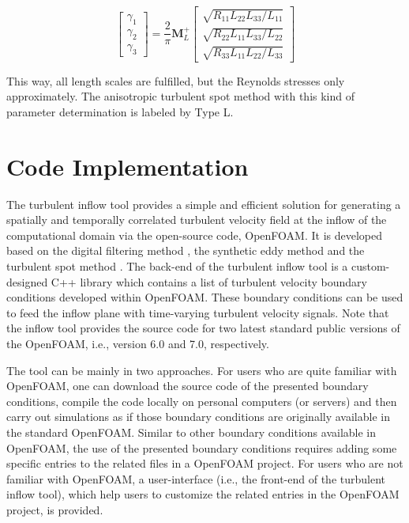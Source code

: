 \begin{equation}
\begin{bmatrix}
\gamma_1 \\
\gamma_2 \\
\gamma_3
\end{bmatrix}=\frac{2}{\pi}\boldsymbol{M}_L^+
\begin{bmatrix}
\sqrt{R_{11}L_{22}L_{33}/L_{11}} \\
\sqrt{R_{22}L_{11}L_{33}/L_{22}} \\
\sqrt{R_{33}L_{11}L_{22}/L_{33}}
\end{bmatrix}
\end{equation}

\noindent This way, all length scales are fulfilled, but the Reynolds stresses only approximately. The anisotropic turbulent spot method with this kind of parameter determination is labeled by Type L.

\section{Code Implementation}

The turbulent inflow tool provides a simple and efficient solution for generating a spatially and temporally correlated turbulent velocity field at the inflow of the computational domain via the open-source code, OpenFOAM. It is developed based on the digital filtering method \citep{klein2003, xie2008}, the synthetic eddy method \citep{jarrin2006, poletto2013} and the turbulent spot method \cite{kroger2018}. The back-end of the turbulent inflow tool is a custom-designed C++ library which contains a list of turbulent velocity boundary conditions developed within OpenFOAM. These boundary conditions can be used to feed the inflow plane with time-varying turbulent velocity signals. Note that the inflow tool provides the source code for two latest standard public versions of the OpenFOAM, i.e., version 6.0 and 7.0, respectively.

The tool can be mainly in two approaches. For users who are quite familiar with OpenFOAM, one can download the source code of the presented boundary conditions, compile the code locally on personal computers (or servers) and then carry out simulations as if those boundary conditions are originally available in the standard OpenFOAM. Similar to other boundary conditions available in OpenFOAM, the use of the presented boundary conditions requires adding some specific entries to the related files in a OpenFOAM project. For users who are not familiar with OpenFOAM, a user-interface (i.e., the front-end of the turbulent inflow tool), which help users to customize the related entries in the OpenFOAM project, is provided.

